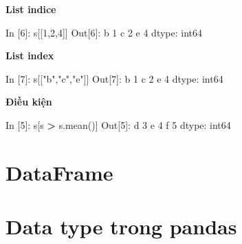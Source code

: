\documentclass[
]{book}
\newenvironment{Shaded}{\begin{snugshade}}{\end{snugshade}}
\newcommand{\DecValTok}[1]{\textcolor[rgb]{0.00,0.00,0.81}{#1}}
\newcommand{\NormalTok}[1]{#1}
\newcommand{\OperatorTok}[1]{\textcolor[rgb]{0.81,0.36,0.00}{\textbf{#1}}}
\newcommand{\StringTok}[1]{\textcolor[rgb]{0.31,0.60,0.02}{#1}}
\begin{document}
\textbf{List indice}

\begin{Shaded}
\begin{Highlighting}[]
\NormalTok{In [}\DecValTok{6}\NormalTok{]: s[[}\DecValTok{1}\NormalTok{,}\DecValTok{2}\NormalTok{,}\DecValTok{4}\NormalTok{]]}
\NormalTok{Out[}\DecValTok{6}\NormalTok{]:}
\NormalTok{b    }\DecValTok{1}
\NormalTok{c    }\DecValTok{2}
\NormalTok{e    }\DecValTok{4}
\NormalTok{dtype: int64}
\end{Highlighting}
\end{Shaded}

\textbf{List index}

\begin{Shaded}
\begin{Highlighting}[]
\NormalTok{In [}\DecValTok{7}\NormalTok{]: s[[}\StringTok{"b"}\NormalTok{,}\StringTok{"c"}\NormalTok{,}\StringTok{"e"}\NormalTok{]]}
\NormalTok{Out[}\DecValTok{7}\NormalTok{]:}
\NormalTok{b    }\DecValTok{1}
\NormalTok{c    }\DecValTok{2}
\NormalTok{e    }\DecValTok{4}
\NormalTok{dtype: int64}
\end{Highlighting}
\end{Shaded}

\textbf{Điều kiện}

\begin{Shaded}
\begin{Highlighting}[]
\NormalTok{In [}\DecValTok{5}\NormalTok{]: s[s }\OperatorTok{\textgreater{}}\NormalTok{ s.mean()]}
\NormalTok{Out[}\DecValTok{5}\NormalTok{]:}
\NormalTok{d    }\DecValTok{3}
\NormalTok{e    }\DecValTok{4}
\NormalTok{f    }\DecValTok{5}
\NormalTok{dtype: int64}
\end{Highlighting}
\end{Shaded}

\hypertarget{dataframe}{%
\section{DataFrame}\label{dataframe}}

\hypertarget{data-type-trong-pandas}{%
\section{Data type trong pandas}\label{data-type-trong-pandas}}
\end{document}
